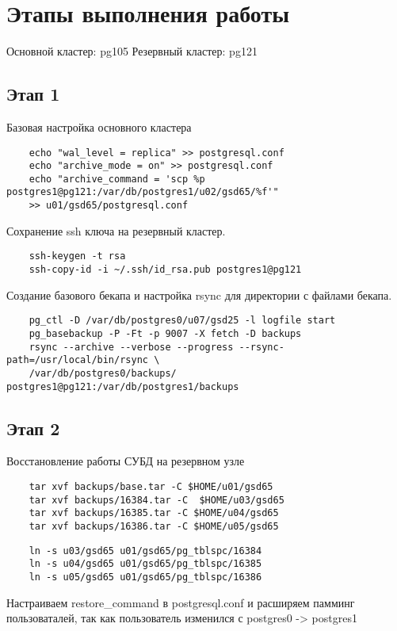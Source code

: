 \documentclass{article}
\begin{document}
\section{Этапы выполнения работы}

Основной кластер: pg105
Резервный кластер: pg121

\subsection{Этап 1}
Базовая настройка основного кластера
\begin{verbatim}
    echo "wal_level = replica" >> postgresql.conf
    echo "archive_mode = on" >> postgresql.conf
    echo "archive_command = 'scp %p postgres1@pg121:/var/db/postgres1/u02/gsd65/%f'" 
    >> u01/gsd65/postgresql.conf
\end{verbatim}
Сохранение ssh ключа на резервный кластер.
\begin{verbatim}
    ssh-keygen -t rsa
    ssh-copy-id -i ~/.ssh/id_rsa.pub postgres1@pg121
\end{verbatim}
Создание базового бекапа и настройка rsync для директории с файлами бекапа.

\begin{verbatim}
    pg_ctl -D /var/db/postgres0/u07/gsd25 -l logfile start
    pg_basebackup -P -Ft -p 9007 -X fetch -D backups
    rsync --archive --verbose --progress --rsync-path=/usr/local/bin/rsync \
    /var/db/postgres0/backups/ postgres1@pg121:/var/db/postgres1/backups 
\end{verbatim}

\subsection{Этап 2}
Восстановление работы СУБД на резервном узле
\begin{verbatim}
    tar xvf backups/base.tar -C $HOME/u01/gsd65
    tar xvf backups/16384.tar -C  $HOME/u03/gsd65
    tar xvf backups/16385.tar -C $HOME/u04/gsd65
    tar xvf backups/16386.tar -C $HOME/u05/gsd65
\end{verbatim}

\begin{verbatim}
    ln -s u03/gsd65 u01/gsd65/pg_tblspc/16384
    ln -s u04/gsd65 u01/gsd65/pg_tblspc/16385
    ln -s u05/gsd65 u01/gsd65/pg_tblspc/16386
\end{verbatim}
Настраиваем restore\_command в postgresql.conf и расширяем памминг пользоваталей, так как пользователь изменился с postgres0 -> postgres1
\end{document}
